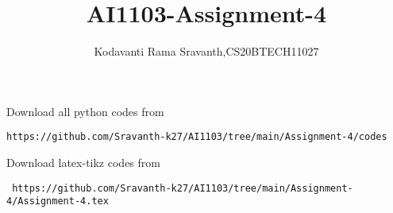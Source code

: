 \documentclass[journal,12pt,twocolumn]{IEEEtran}
\DeclareMathOperator*{\Res}{Res}
\begin{document}
\newcommand{\BEQA}{\begin{eqnarray}}
\newcommand{\EEQA}{\end{eqnarray}}
\newcommand{\define}{\stackrel{\triangle}{=}}

\raggedbottom
\setlength{\parindent}{0pt}
\providecommand{\mbf}{\mathbf}
\providecommand{\pr}[1]{\ensuremath{\Pr\left(#1\right)}}
\providecommand{\qfunc}[1]{\ensuremath{Q\left(#1\right)}}
\providecommand{\sbrak}[1]{\ensuremath{{}\left[#1\right]}}
\providecommand{\lsbrak}[1]{\ensuremath{{}\left[#1\right.}}
\providecommand{\rsbrak}[1]{\ensuremath{{}\left.#1\right]}}
\providecommand{\brak}[1]{\ensuremath{\left(#1\right)}}
\providecommand{\lbrak}[1]{\ensuremath{\left(#1\right.}}
\providecommand{\rbrak}[1]{\ensuremath{\left.#1\right)}}
\providecommand{\cbrak}[1]{\ensuremath{\left\{#1\right\}}}
\providecommand{\lcbrak}[1]{\ensuremath{\left\{#1\right.}}
\providecommand{\rcbrak}[1]{\ensuremath{\left.#1\right\}}}
\theoremstyle{remark}
\newtheorem{rem}{Remark}
\newcommand{\sgn}{\mathop{\mathrm{sgn}}}
\providecommand{\abs}[1]{\vert#1\vert}
\providecommand{\res}[1]{\Res\displaylimits_{#1}} 
\providecommand{\norm}[1]{\lVert#1\rVert}
\providecommand{\mtx}[1]{\mathbf{#1}}
\providecommand{\mean}[1]{E[ #1 ]}
\providecommand{\fourier}{\overset{\mathcal{F}}{ \rightleftharpoons}}
\providecommand{\system}{\overset{\mathcal{H}}{ \longleftrightarrow}}
\newcommand{\solution}{\noindent \textbf{Solution: }}
\newcommand{\cosec}{\,\text{cosec}\,}
\providecommand{\dec}[2]{\ensuremath{\overset{#1}{\underset{#2}{\gtrless}}}}
\newcommand{\myvec}[1]{\ensuremath{\begin{pmatrix}#1\end{pmatrix}}}
\newcommand{\mydet}[1]{\ensuremath{\begin{vmatrix}#1\end{vmatrix}}}
\makeatletter
{}
\makeatother
\let\StandardTheFigure\thefigure
\let\vec\mathbf
\renewcommand{\thefigure}{\theproblem}
\def\putbox#1#2#3{\makebox[0in][l]{\makebox[#1][l]{}\raisebox{\baselineskip}[0in][0in]{\raisebox{#2}[0in][0in]{#3}}}}
     \def\rightbox#1{\makebox[0in][r]{#1}}
     \def\centbox#1{\makebox[0in]{#1}}
     \def\topbox#1{\raisebox{-\baselineskip}[0in][0in]{#1}}
     \def\midbox#1{\raisebox{-0.5\baselineskip}[0in][0in]{#1}}
\vspace{3cm}
\title{AI1103-Assignment-4}
\author{Kodavanti Rama Sravanth,CS20BTECH11027}
\maketitle
\newpage
\bigskip
\renewcommand{\thefigure}{\theenumi}
\renewcommand{\thetable}{\theenumi}
Download all python codes from 
\begin{lstlisting}
https://github.com/Sravanth-k27/AI1103/tree/main/Assignment-4/codes
\end{lstlisting}
%
Download latex-tikz codes from 
%
\begin{lstlisting}
 https://github.com/Sravanth-k27/AI1103/tree/main/Assignment-4/Assignment-4.tex 
\end{lstlisting}
\end{document}
